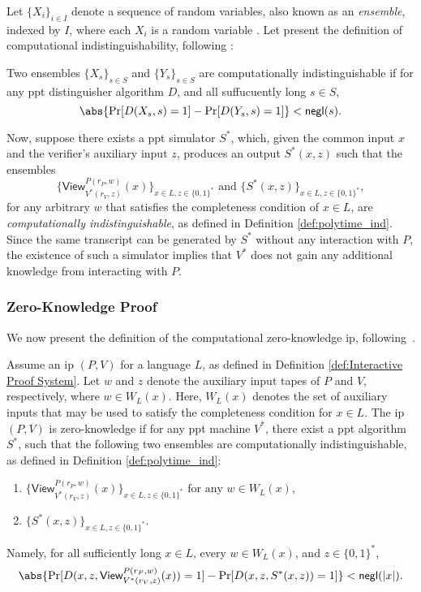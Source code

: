 Let $\{X_i\}_{i \in I}$ denote a sequence of random variables, also known as an \textit{ensemble}, indexed by $I$, where each $X_i$ is a random variable \cite{Goldreich2001Book}.  Let present the definition of computational indistinguishability, following \cite[Definition 3.2.2]{Goldreich2001Book}:
\begin{definition}\label{def:polytime_ind}	
	Two ensembles $\{X_s\}_{s\in S}$ and $\{Y_s\}_{s\in S}$ are  computationally indistinguishable if for any \gls{ppt} distinguisher algorithm $D$, and all suffucuently long $s \in S$,
	\[
	\abs{\Pr[D(X_s, s) = 1] - \Pr[D(Y_s, s) = 1]} < \mathsf{negl}(s).
	\]
\end{definition}



Now, suppose there exists a \gls{ppt} simulator $S^*$, which, given the common input $x$ and the verifier's auxiliary input $z$, produces an output $S^*(x, z)$ such that the ensembles  
\[
\{\textsf{View}_{V^*(r_V, z)}^{P(r_P, w)}(x)\}_{x\in L, z \in \{0,1\}^*} \text{ and } \{S^*(x, z)\}_{x\in L, z \in \{0,1\}^*},
\]  
for any arbitrary $w$ that satisfies the completeness condition of $x\in L$, are \textit{computationally indistinguishable}, as defined in Definition \ref{def:polytime_ind}. Since the same transcript can be generated by $S^*$ without any interaction with $P$, the existence of such a simulator implies that $V^*$ does not gain any additional knowledge from interacting with $P$.


\subsubsection{Zero-Knowledge Proof}
We now present the definition of the computational zero-knowledge \gls{ip}, following~\cite[Definition 4.3.10]{Goldreich2001Book}.

\begin{definition}\label{def:zk-proerty}	Assume an \gls{ip} $(P, V)$ for a language $L$, as defined in Definition \ref{def:Interactive Proof System}. Let $w$ and $z$ denote the auxiliary input tapes of $P$ and $V$, respectively, where $w \in W_L(x)$. Here, $W_L(x)$ denotes the set of auxiliary inputs that may be used to satisfy the completeness condition for $x \in L$.  The \gls{ip} $(P, V)$  is zero-knowledge if for any \gls{ppt} machine $V^*$, there exist a  \gls{ppt} algorithm $S^*$, such that the following  two ensembles are computationally indistinguishable, as defined in Definition \ref{def:polytime_ind}:
\begin{enumerate}
	\item $\{\textsf{View}_{V^*(r_V, z)}^{P(r_P, w)}(x)\}_{x\in L, z \in \{0,1\}^*} \text{ for any } w \in  W_L(x)$,
	\item $\{S^*(x, z)\}_{x\in L, z \in \{0,1\}^*}$.
\end{enumerate}
Namely, for all sufficiently long $x \in L$, every $w \in  W_L(x)$, and $z \in \{0,1\}^*$,
\[
	\abs{\Pr[D(x, z, \textsf{View}_{V^*(r_V, z)}^{P(r_P, w)}(x)) = 1] - \Pr[D(x, z, S^*(x, z)) = 1]} < \mathsf{negl}(|x|).
\]
\end{definition}


